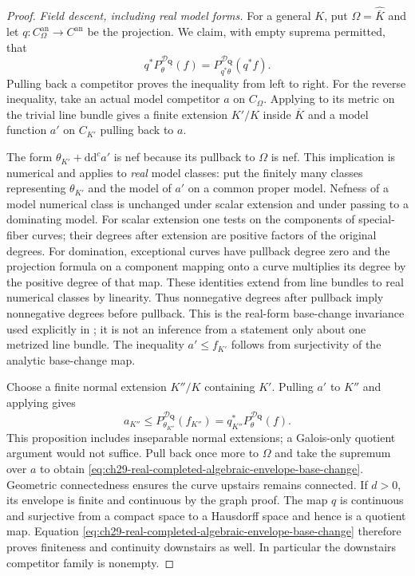 \begin{proof}
\emph{Field descent, including real model forms.}
For a general $K$, put $\Omega=\widehat{\overline K}$ and let
$q:C_{\Omega}^{\mathrm{an}}\to C^{\mathrm{an}}$ be the projection.
We claim, with empty suprema permitted, that
\begin{equation}
\label{eq:ch29-real-completed-algebraic-envelope-base-change}
 q^*P^{\mathcal D_{\mathbf Q}}_\theta(f)
  =P^{\mathcal D_{\mathbf Q}}_{q^*\theta}(q^*f).
\end{equation}
Pulling back a competitor proves the inequality from left to right.
For the reverse inequality, take an actual model competitor $a$ on
$C_{\Omega}$.  Applying \cite[Proposition~2.18(b)]{GM19} to its metric on
the trivial line bundle gives a finite extension $K'/K$ inside
$\overline K$ and a model function $a'$ on $C_{K'}$ pulling back to
$a$.

The form $\theta_{K'}+\mathrm d\mathrm d^ca'$ is nef because its
pullback to $\Omega$ is nef.  This implication is numerical and applies to
\emph{real} model classes: put the finitely many classes representing
$\theta_{K'}$ and the model of $a'$ on a common proper model.
Nefness of a model numerical class is unchanged under scalar extension
and under passing to a dominating model.  For scalar extension one tests
on the components of special-fiber curves; their degrees after extension
are positive factors of the original degrees.  For domination,
exceptional curves have pullback degree zero and the projection formula
on a component mapping onto a curve multiplies its degree by the
positive degree of that map.  These identities extend from line bundles
to real numerical classes by linearity.  Thus nonnegative degrees after
pullback imply nonnegative degrees before pullback.  This is the real-form
base-change invariance used explicitly in
\cite[proof of Proposition~3.7]{GJKM19}; it is not an inference from a
statement only about one metrized line bundle.  The inequality
$a'\leq f_{K'}$ follows from surjectivity of the analytic base-change
map.

Choose a finite normal extension $K''/K$ containing $K'$.  Pulling $a'$
to $K''$ and applying \cite[Proposition~2.11]{GJKM19} gives
\[
 a_{K''}\leq P^{\mathcal D_{\mathbf Q}}_{\theta_{K''}}(f_{K''})
           =q_{K''}^*P^{\mathcal D_{\mathbf Q}}_\theta(f).
\]
This proposition includes inseparable normal extensions; a Galois-only
quotient argument would not suffice.  Pull back once more to $\Omega$ and
take the supremum over $a$ to obtain
\eqref{eq:ch29-real-completed-algebraic-envelope-base-change}.
Geometric connectedness ensures the curve upstairs remains connected.
If $d>0$, its envelope is finite and continuous by the graph proof.
The map $q$ is continuous and surjective from a compact space to a
Hausdorff space and hence is a quotient map.  Equation
\eqref{eq:ch29-real-completed-algebraic-envelope-base-change} therefore
proves finiteness and continuity downstairs as well.  In particular the
downstairs competitor family is nonempty.


\end{proof}
